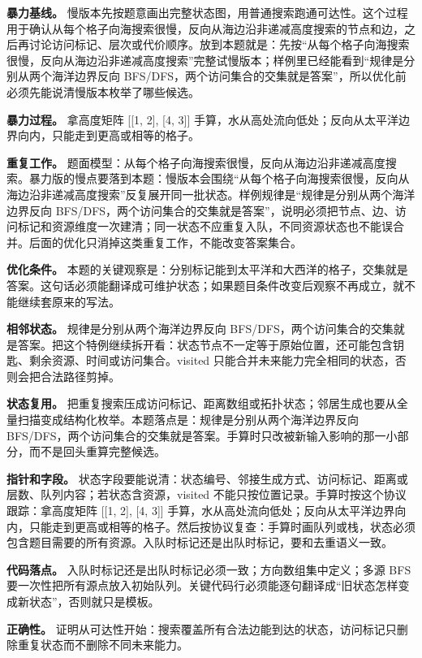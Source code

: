 \textbf{暴力基线。} 慢版本先按题意画出完整状态图，用普通搜索跑通可达性。这个过程用于确认从每个格子向海搜索很慢，反向从海边沿非递减高度搜索的节点和边，之后再讨论访问标记、层次或代价顺序。放到本题就是：先按“从每个格子向海搜索很慢，反向从海边沿非递减高度搜索”完整试慢版本；样例里已经能看到“规律是分别从两个海洋边界反向 BFS/DFS，两个访问集合的交集就是答案”，所以优化前必须先能说清慢版本枚举了哪些候选。

\textbf{暴力过程。} 拿高度矩阵 [[1, 2], [4, 3]] 手算，水从高处流向低处；反向从太平洋边界向内，只能走到更高或相等的格子。

\textbf{重复工作。} 题面模型：从每个格子向海搜索很慢，反向从海边沿非递减高度搜索。暴力版的慢点要落到本题：慢版本会围绕“从每个格子向海搜索很慢，反向从海边沿非递减高度搜索”反复展开同一批状态。样例规律是“规律是分别从两个海洋边界反向 BFS/DFS，两个访问集合的交集就是答案”，说明必须把节点、边、访问标记和资源维度一次建清；同一状态不应重复入队，不同资源状态也不能误合并。后面的优化只消掉这类重复工作，不能改变答案集合。

\textbf{优化条件。} 本题的关键观察是：分别标记能到太平洋和大西洋的格子，交集就是答案。这句话必须能翻译成可维护状态；如果题目条件改变后观察不再成立，就不能继续套原来的写法。

\textbf{相邻状态。} 规律是分别从两个海洋边界反向 BFS/DFS，两个访问集合的交集就是答案。把这个特例继续拆开看：状态节点不一定等于原始位置，还可能包含钥匙、剩余资源、时间或访问集合。visited 只能合并未来能力完全相同的状态，否则会把合法路径剪掉。

\textbf{状态复用。} 把重复搜索压成访问标记、距离数组或拓扑状态；邻居生成也要从全量扫描变成结构化枚举。本题落点是：规律是分别从两个海洋边界反向 BFS/DFS，两个访问集合的交集就是答案。手算时只改被新输入影响的那一小部分，而不是回头重算完整候选。

\textbf{指针和字段。} 状态字段要能说清：状态编号、邻接生成方式、访问标记、距离或层数、队列内容；若状态含资源，visited 不能只按位置记录。手算时按这个协议跟踪：拿高度矩阵 [[1, 2], [4, 3]] 手算，水从高处流向低处；反向从太平洋边界向内，只能走到更高或相等的格子。然后按协议复查：手算时画队列或栈，状态必须包含题目需要的所有资源。入队时标记还是出队时标记，要和去重语义一致。

\textbf{代码落点。} 入队时标记还是出队时标记必须一致；方向数组集中定义；多源 BFS 要一次性把所有源点放入初始队列。关键代码行必须能逐句翻译成“旧状态怎样变成新状态”，否则就只是模板。

\textbf{正确性。} 证明从可达性开始：搜索覆盖所有合法边能到达的状态，访问标记只删除重复状态而不删除不同未来能力。

